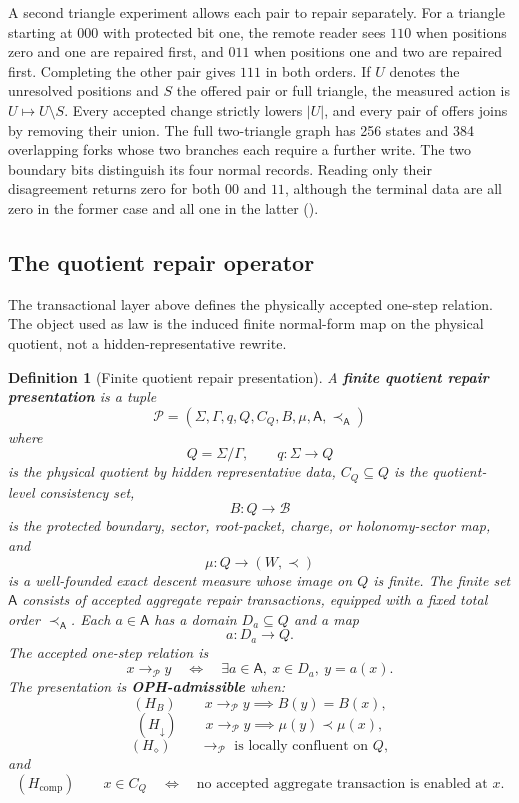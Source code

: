 \documentclass[11pt]{article}
\newtheorem{definition}[theorem]{Definition}
\theoremstyle{remark}
\theoremstyle{plain}
\begin{document}
A second triangle experiment allows each pair to repair separately.
For a triangle starting at $000$ with protected bit one, the remote
reader sees $110$ when positions zero and one are repaired first, and
$011$ when positions one and two are repaired first. Completing the
other pair gives $111$ in both orders. If $U$ denotes the unresolved
positions and $S$ the offered pair or full triangle, the measured action
is $U\mapsto U\setminus S$. Every accepted change strictly lowers
$|U|$, and every pair of offers joins by removing their union.
The full two-triangle graph has 256 states and 384 overlapping forks
whose two branches each require a further write. The two boundary bits
distinguish its four normal records. Reading only their disagreement
returns zero for both $00$ and $11$, although the terminal data are all
zero in the former case and all one in the latter
().

\subsection{The quotient repair operator}

The transactional layer above defines the physically accepted one-step relation.  The object used
as law is the induced finite normal-form map on the physical quotient, not a hidden-representative
rewrite.

\begin{definition}[Finite quotient repair presentation]\label{def:finite-quotient-repair-presentation}
A \textbf{finite quotient repair presentation} is a tuple
\[
\mathcal P=(\Sigma,\Gamma,q,Q,C_Q,B,\mu,\mathsf A,\prec_{\mathsf A})
\]
where
\[
Q=\Sigma/\Gamma,\qquad q:\Sigma\to Q
\]
is the physical quotient by hidden representative data, \(C_Q\subseteq Q\) is the
quotient-level consistency set,
\[
B:Q\to\mathcal B
\]
is the protected boundary, sector, root-packet, charge, or holonomy-sector map, and
\[
\mu:Q\to(W,\prec)
\]
is a well-founded exact descent measure whose image on \(Q\) is finite.  The finite set
\(\mathsf A\) consists of accepted aggregate repair transactions, equipped with a fixed total
order \(\prec_{\mathsf A}\).  Each \(a\in\mathsf A\) has a domain \(D_a\subseteq Q\) and a map
\[
a:D_a\to Q.
\]
The accepted one-step relation is
\[
x\to_{\mathcal P} y
\quad\Longleftrightarrow\quad
\exists a\in\mathsf A,\ x\in D_a,\ y=a(x).
\]
The presentation is \textbf{OPH-admissible} when:
\[
(H_B)\qquad x\to_{\mathcal P}y\implies B(y)=B(x),
\]
\[
(H_\downarrow)\qquad x\to_{\mathcal P}y\implies \mu(y)\prec\mu(x),
\]
\[
(H_\diamond)\qquad \to_{\mathcal P}\text{ is locally confluent on }Q,
\]
and
\[
(H_{\mathrm{comp}})\qquad
x\in C_Q
\quad\Longleftrightarrow\quad
\text{no accepted aggregate transaction is enabled at }x.
\]
\end{definition}
\end{document}
